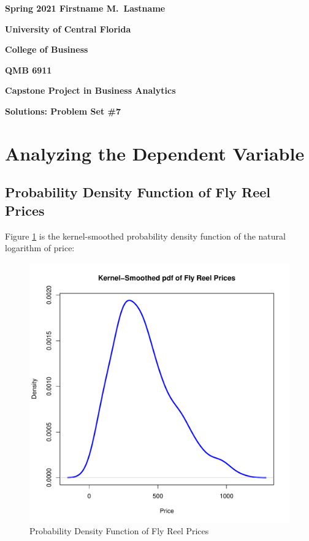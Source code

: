 \documentclass[11pt]{paper}
\begin{document}

\pagestyle{empty}
{\noindent\bf Spring 2021 \hfill Firstname M.~Lastname}
\vskip 16pt
\centerline{\bf University of Central Florida}
\centerline{\bf College of Business}
\vskip 16pt
\centerline{\bf QMB 6911}
\centerline{\bf Capstone Project in Business Analytics}
\vskip 10pt
\centerline{\bf Solutions:  Problem Set \#7}
\vskip 32pt
\noindent


\section{Analyzing the Dependent Variable}

\subsection{Probability Density Function of Fly Reel Prices}

Figure \ref{fig:density_prices} is the kernel-smoothed probability density function of the natural logarithm of
price:

\begin{figure}[h!]
  \centering
  \includegraphics[scale = 0.5, keepaspectratio=true]{../Figures/density_prices}
  \caption{Probability Density Function of Fly Reel Prices} \label{fig:density_prices}
\end{figure}
\end{document}
